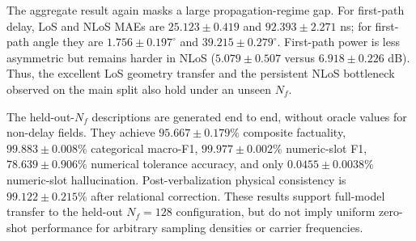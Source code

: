 \documentclass{article}
\begin{document}
\begin{table}[t]
\centering
\caption{Full-model results on the held-out $N_f=128$ configuration (mean $\pm$ sample standard deviation over seeds 0, 1, and 2).}
\label{tab:nf128full}
\end{table}

The aggregate result again masks a large propagation-regime gap.
For first-path delay, LoS and NLoS MAEs are $25.123\pm0.419$ and $92.393\pm2.271$ ns; for first-path angle they are $1.756\pm0.197^\circ$ and $39.215\pm0.279^\circ$.
First-path power is less asymmetric but remains harder in NLoS ($5.079\pm0.507$ versus $6.918\pm0.226$ dB).
Thus, the excellent LoS geometry transfer and the persistent NLoS bottleneck observed on the main split also hold under an unseen $N_f$.

The held-out-$N_f$ descriptions are generated end to end, without oracle values for non-delay fields.
They achieve $95.667\pm0.179\%$ composite factuality, $99.883\pm0.008\%$ categorical macro-F1, $99.977\pm0.002\%$ numeric-slot F1, $78.639\pm0.906\%$ numerical tolerance accuracy, and only $0.0455\pm0.0038\%$ numeric-slot hallucination.
Post-verbalization physical consistency is $99.122\pm0.215\%$ after relational correction.
These results support full-model transfer to the held-out $N_f=128$ configuration, but do not imply uniform zero-shot performance for arbitrary sampling densities or carrier frequencies.
\end{document}
